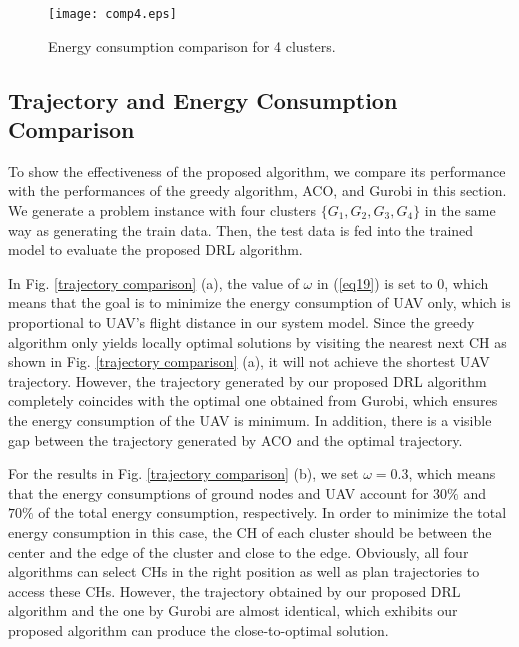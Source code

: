 \documentclass[journal]{IEEEtran}
\begin{document}
\begin{figure}[!t]
	\centering
	\texttt{[image: comp4.eps]}
	\caption{{Energy consumption comparison for 4 clusters.}}
	\label{comparisonratio}
\end{figure}


\subsection{Trajectory and Energy Consumption Comparison}


To show the effectiveness of the proposed algorithm, we compare its performance with the performances of the greedy algorithm, ACO, and Gurobi in this section. We generate a problem instance with four clusters $\{G_1, G_2, G_3, G_4\}$ in the same way as generating the train data. Then, the test data is fed into the trained model to evaluate the proposed DRL algorithm.


In Fig. \ref{trajectory comparison} (a), the value of $\omega$ in (\ref{eq19}) is set to $0$, which means that the goal is to minimize the energy consumption of UAV only, which is proportional to UAV's flight distance in our system model. Since the greedy algorithm only yields locally optimal solutions by visiting the nearest next CH as shown in  Fig. \ref{trajectory comparison} (a), it will not achieve the shortest UAV trajectory. However, the trajectory generated by our proposed DRL algorithm completely coincides with the optimal one obtained from Gurobi, which ensures the energy consumption of the UAV is minimum. In addition, there is a visible gap between the trajectory generated by ACO and the optimal trajectory.



For the results in Fig. \ref{trajectory comparison} (b), we set $\omega=0.3$, which means that the energy consumptions of ground nodes and UAV account for $30\%$ and $70\%$ of the total energy consumption, respectively. In order to minimize the total energy consumption in this case, the CH of each cluster should be between the center and the edge of the cluster and close to the edge. Obviously, all four algorithms can select CHs in the right position as well as plan trajectories to access these CHs. However, the trajectory obtained by our proposed DRL algorithm and the one by Gurobi are almost identical, which exhibits our proposed algorithm can produce the close-to-optimal solution.
\end{document}

